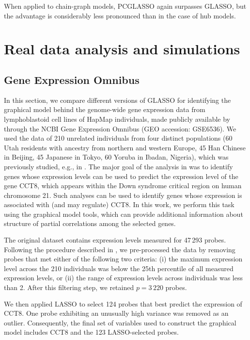 \documentclass[12pt]{amsart}
\numberwithin{equation}{section}
\numberwithin{equation}{section}
\theoremstyle{plain}
\theoremstyle{definition}
\begin{document}
When applied to chain-graph models, PCGLASSO again surpasses GLASSO, but the advantage is considerably less pronounced than in the case of hub models.


\section{Real data analysis and simulations}\label{sec:num_exp}

\subsection{Gene Expression Omnibus}\label{sec:real_ex}
In this section, we compare different versions of GLASSO for identifying the graphical model behind the genome-wide gene expression data from lymphoblastoid cell lines of HapMap individuals, made publicly available by \cite{GSE6536} through the NCBI Gene Expression Omnibus (GEO accession: GSE6536). We used the data of 210 unrelated individuals from four distinct populations (60 Utah residents with ancestry from northern and western Europe, 45 Han Chinese in
Beijing, 45 Japanese in Tokyo, 60 Yoruba in Ibadan, Nigeria), which was previously studied, e.g., in \cite{bradic2011, fanfanbarut14, Wojtek, frommlet22}.  
The major goal of the analysis in \cite{frommlet22} was to identify genes whose expression levels can be used  to predict the expression level of the gene CCT8, which appears within the Down syndrome critical region on human chromosome 21. Such analyses can be used to identify genes whose expression is associated with (and may regulate) CCT8. In this work, we perform this task using the graphical model tools, which can provide additional information about structure of partial correlations among the selected genes.

The original dataset contains expression levels measured for 47\,293 probes. Following the procedure described in \cite{Wojtek}, we pre-processed the data by removing probes that met either of the following two criteria: (i) the maximum expression level across the 210 individuals was below the 25th percentile of all measured expression levels, or (ii) the range of expression levels across individuals was less than 2. After this filtering step, we retained
$p=3\,220$ probes.

We then applied LASSO to select 124 probes that best predict the expression of CCT8. One probe exhibiting an unusually high variance was removed as an outlier. Consequently, the final set of variables used to construct the graphical model includes CCT8 and the 123 LASSO-selected probes.
\end{document}
